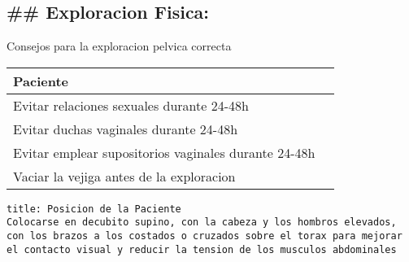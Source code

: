 \documentclass[
]{article}
\begin{document}
\hypertarget{exploracion-fisica}{%
\subsection{\#\# Exploracion Fisica:}\label{exploracion-fisica}}

Consejos para la exploracion pelvica correcta

\begin{longtable}[]{@{}ll@{}}
\toprule
Paciente &\tabularnewline
\midrule
\endhead
Evitar relaciones sexuales durante 24-48h &\tabularnewline
Evitar duchas vaginales durante 24-48h &\tabularnewline
Evitar emplear supositorios vaginales durante 24-48h &\tabularnewline
Vaciar la vejiga antes de la exploracion &\tabularnewline
\bottomrule
\end{longtable}

\begin{verbatim}
title: Posicion de la Paciente
Colocarse en decubito supino, con la cabeza y los hombros elevados, con los brazos a los costados o cruzados sobre el torax para mejorar el contacto visual y reducir la tension de los musculos abdominales
\end{verbatim}
\end{document}
